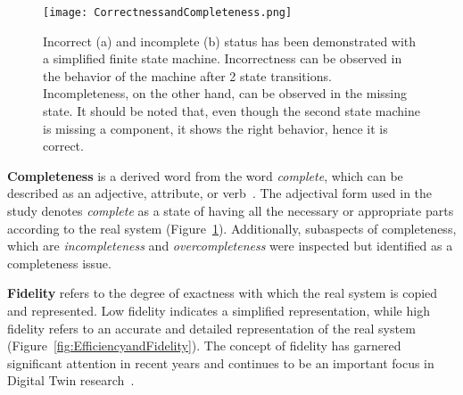 \documentclass{llncs}
\begin{document}
    \begin{figure}[htbp]
        \centering
        \texttt{[image: CorrectnessandCompleteness.png]}
        \caption{Incorrect (a) and incomplete (b) status has been demonstrated with a simplified finite state machine. Incorrectness can be observed in the behavior 
        of the machine after 2 state transitions. Incompleteness, on the other hand, can be observed in the missing state. It should be noted that, even though the second state machine is missing a 
        component, it shows the right behavior, hence it is correct.}\label{fig:CorrectnessAndCompleteness}
    \end{figure}

    \textbf{Completeness} is a derived word from the word  \textit{complete}, which can be described as an adjective, attribute, or verb~\cite{OxfordDictionary}. 
    The adjectival form used in the study denotes \textit{complete} as a state of having all the necessary or appropriate parts according to the real system 
    (Figure~\ref{fig:CorrectnessAndCompleteness}). Additionally, subaspects of completeness, which are \textit{incompleteness} and \textit{overcompleteness} 
    were inspected but identified as a completeness issue.  

    \textbf{Fidelity} refers to the degree of exactness with which the real system is copied and represented. 
    Low fidelity indicates a simplified representation, 
    while high fidelity refers to an accurate and detailed representation of the real system~\cite{Review2} (Figure~\ref{fig:EfficiencyandFidelity}). 
    The concept of fidelity has garnered significant attention in recent
    years and continues to be an important focus in Digital Twin research~\cite{Review2,Review1}.
\end{document}
